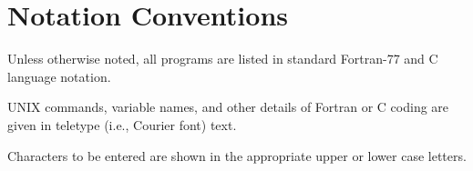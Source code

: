 \section*{Notation Conventions}

Unless otherwise noted, all programs are listed in standard Fortran-77 and C language notation.

UNIX commands, variable names, and other details of Fortran or C coding 
are given in teletype (i.e., Courier font) text.

Characters to be entered are shown in the appropriate upper or lower case letters.

